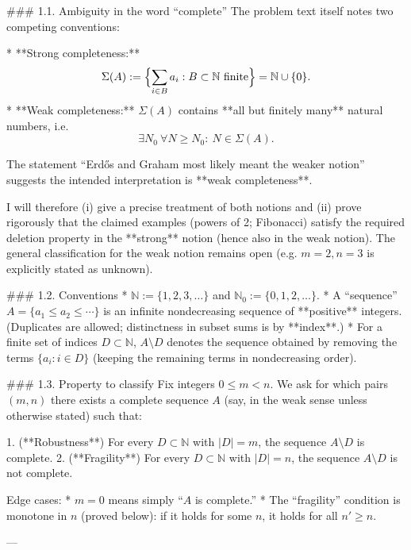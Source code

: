 ### 1.1. Ambiguity in the word “complete”
The problem text itself notes two competing conventions:

* **Strong completeness:**
  \[
  \Sigma(A):=\Bigl\{\sum_{i\in B} a_i : B\subset \mathbb N\text{ finite}\Bigr\}=\mathbb N\cup\{0\}.
  \]
* **Weak completeness:** \(\Sigma(A)\) contains **all but finitely many** natural numbers, i.e.
  \[
  \exists N_0\ \forall N\ge N_0:\ N\in\Sigma(A).
  \]

The statement “Erd\H{o}s and Graham most likely meant the weaker notion” suggests the intended
interpretation is **weak completeness**.

I will therefore (i) give a precise treatment of both notions and (ii) prove rigorously that the
claimed examples (powers of 2; Fibonacci) satisfy the required deletion property in the **strong**
notion (hence also in the weak notion). The general classification for the weak notion remains open
(e.g. \(m=2,n=3\) is explicitly stated as unknown).

### 1.2. Conventions
* \(\mathbb N:=\{1,2,3,\dots\}\) and \(\mathbb N_0:=\{0,1,2,\dots\}\).
* A “sequence” \(A=\{a_1\le a_2\le\cdots\}\) is an infinite nondecreasing sequence of **positive** integers.
  (Duplicates are allowed; distinctness in subset sums is by **index**.)
* For a finite set of indices \(D\subset\mathbb N\), \(A\setminus D\) denotes the sequence obtained by
  removing the terms \(\{a_i: i\in D\}\) (keeping the remaining terms in nondecreasing order).

### 1.3. Property to classify
Fix integers \(0\le m<n\). We ask for which pairs \((m,n)\) there exists a complete sequence \(A\)
(say, in the weak sense unless otherwise stated) such that:

1. (**Robustness**) For every \(D\subset\mathbb N\) with \(|D|=m\), the sequence \(A\setminus D\) is complete.
2. (**Fragility**) For every \(D\subset\mathbb N\) with \(|D|=n\), the sequence \(A\setminus D\) is not complete.

Edge cases:
* \(m=0\) means simply “\(A\) is complete.”
* The “fragility” condition is monotone in \(n\) (proved below): if it holds for some \(n\), it holds
  for all \(n'\ge n\).

---
